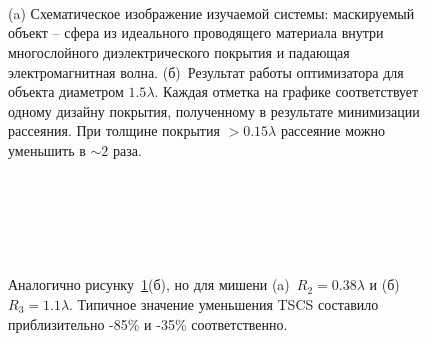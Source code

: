 \begin{figure}[p]
  \begin{minipage}[ht]{0.99\linewidth}
  \end{minipage}\\
  \vfill
  \begin{minipage}[ht]{0.99\linewidth}
  \end{minipage}\\
  \vfill
  \begin{minipage}[ht]{0.99\linewidth}
  \end{minipage}\\
  \vfill
  \begin{minipage}[ht]{0.99\linewidth}
  \end{minipage}
  \vfill

  \caption{(a) Схематическое изображение изучаемой системы:
    маскируемый объект -- сфера из идеального проводящего материала
    внутри многослойного диэлектрического покрытия и падающая
    электромагнитная волна. (б)~Результат работы оптимизатора для
    объекта диаметром $1.5\lambda$.  Каждая отметка на графике
    соответствует одному дизайну покрытия, полученному в результате
    минимизации рассеяния. При толщине покрытия $>0.15\lambda$
    рассеяние можно уменьшить в $\sim 2$ раза.}
  \label{img:scattering}  
\end{figure}

\begin{figure}[p]
  \begin{minipage}[ht]{0.99\linewidth}
  \end{minipage}\\
  \begin{minipage}[ht]{0.99\linewidth}
  \end{minipage}\\
  \vfill
  \begin{minipage}[ht]{0.99\linewidth}
  \end{minipage}\\
  \begin{minipage}[ht]{0.99\linewidth}
  \end{minipage}
  \vfill
  \caption{Аналогично рисунку~\ref{img:scattering}(б), но для мишени
    (a)~${R_2 = 0.38\lambda}$ и (б)~${R_3 = 1.1\lambda}$.  Типичное
    значение уменьшения TSCS составило приблизительно -85\% и -35\%
    соответственно.  \label{img:rcs-overview-r14-42}}%
\end{figure}


